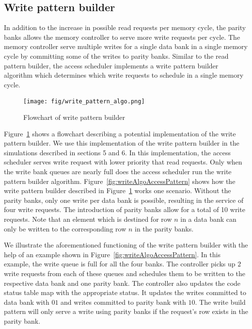 \subsection{Write pattern builder}
\label{sec:writeCodingAlgo}
In addition to the increase in possible read requests per memory cycle, the parity banks allows the memory controller to serve more write requests per cycle. The memory controller serve multiple writes for a single data bank in a single memory cycle by committing some of the writes to parity banks. Similar to the read pattern builder, the access scheduler implements a write pattern builder algorithm which determines which write requests to schedule in a single memory cycle. 

\begin{figure}[htbp]
\centering
	\texttt{[image: fig/write\_pattern\_algo.png]}
	\caption{{ Flowchart of write pattern builder}}
	\label{fig:writeFlow}
\end{figure}

Figure~\ref{fig:writeFlow} shows a flowchart describing a potential implementation of the write pattern builder. We use this implementation of the write pattern builder in the simulations described in sections 5 and 6. In this implementation, the access scheduler serves write request with lower priority that read requests. Only when the write bank queues are nearly full does the access scheduler run the write pattern builder algorithm. Figure~\ref{fig:writeAlgoAccessPattern} shows how the write pattern builder described in Figure~\ref{fig:writeFlow} works one scenario. Without the parity banks, only one write per data bank is possible, resulting in the service of four write requests. The introduction of parity banks allow for a total of 10 write requests. Note that an element which is destined for row $n$ in a data bank can only be written to the corresponding row $n$ in the parity banks. 

We illustrate the aforementioned functioning of the write pattern builder with the help of an example shown in Figure~\ref{fig:writeAlgoAccessPattern}. In this example, the write queue is full for all the four banks. The controller picks up $2$ write requests from each of these queues and schedules them to be written to the respective data bank and one parity bank. The controller also updates the code status table map with the appropriate status. It updates the writes committed to data bank with $01$ and writes committed to parity bank with $10$. The write build pattern will only serve a write using parity banks if the request's row exists in the parity bank. 

